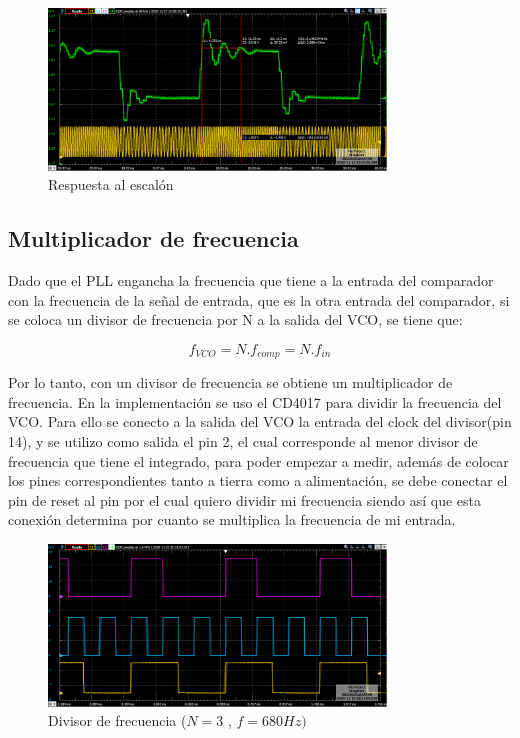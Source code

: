 \begin{figure}[H]
	\includegraphics[width= 0.8\textwidth]{../1. PLL/Imagenes/RespEscalonMedicion.png}
	\centering
	\caption{Respuesta al escalón}
	\label{fig:REspEscalon}
\end{figure}

\subsection{Multiplicador de frecuencia}
Dado que el PLL engancha la frecuencia que tiene a la entrada del comparador con la frecuencia de la señal de entrada, que es la otra entrada del comparador, si se coloca un divisor de frecuencia por N a la salida del VCO, se tiene que:

\begin{equation}
	f_{VCO} = N . f_{comp} = N . f_{in}
\end{equation}

Por lo tanto, con un divisor de frecuencia se obtiene un multiplicador de frecuencia. En la implementación se uso el CD4017 para dividir la frecuencia del VCO. Para ello se conecto a la salida del VCO la entrada del clock del divisor(pin 14), y se utilizo como salida el pin 2, el cual corresponde al menor divisor de frecuencia que tiene el integrado, para poder empezar a medir, además de colocar los pines correspondientes tanto a tierra como a alimentación, se debe conectar el pin de reset al pin por el cual quiero dividir mi frecuencia siendo así que esta conexión determina por cuanto se multiplica la frecuencia de mi entrada. 

\begin{figure}[H]
	\includegraphics[width= 0.8\textwidth]{../1. PLL/Imagenes/DIV3f680.png}
	\centering
	\caption{Divisor de frecuencia ($N=3$ , $f=680Hz)$}
	\label{fig:Div3Frec680}
\end{figure}

